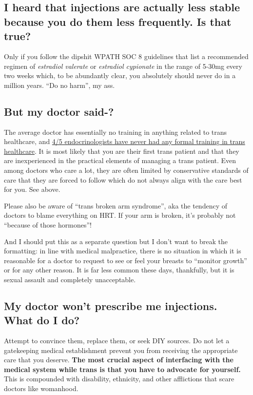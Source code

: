 \documentclass{article}
\begin{document}
\subsection{I heard that injections are actually less stable because you do them less frequently. Is that true?}

Only if you follow the dipshit WPATH SOC 8 guidelines that list a recommended regimen of \textit{estradiol valerate} or \textit{estradiol cypionate} in the range of 5-30mg every two weeks which, to be abundantly clear, you absolutely should never do in a million years. “Do no harm”, my ass. 

\subsection{But my doctor said-?}

The average doctor has essentially no training in anything related to trans healthcare, and \href{https://www.endocrine.org/news-and-advocacy/news-room/2017/endocrinologists-want-training-in-transgender-care }{4/5 endocrinologists have never had any formal training in trans healthcare}. It is most likely that you are their first trans patient and that they are inexperienced in the practical elements of managing a trans patient. Even among doctors who care a lot, they are often limited by conservative standards of care that they are forced to follow which do not always align with the care best for you. See above.

Please also be aware of “trans broken arm syndrome”, aka the tendency of doctors to blame everything on HRT. If your arm is broken, it's probably not “because of those hormones”!

And I should put this as a separate question but I don't want to break the formatting: in line with medical malpractice, there is no situation in which it is reasonable for a doctor to request to see or feel your breasts to “monitor growth” or for any other reason. It is far less common these days, thankfully, but it is sexual assault and completely unacceptable.

\subsection{My doctor won’t prescribe me injections. What do I do?}

Attempt to convince them, replace them, or seek DIY sources. Do not let a gatekeeping medical establishment prevent you from receiving the appropriate care that you deserve. \textbf{The most crucial aspect of interfacing with the medical system while trans is that you have to advocate for yourself. }This is compounded with disability, ethnicity, and other afflictions that scare doctors like womanhood.
\end{document}

